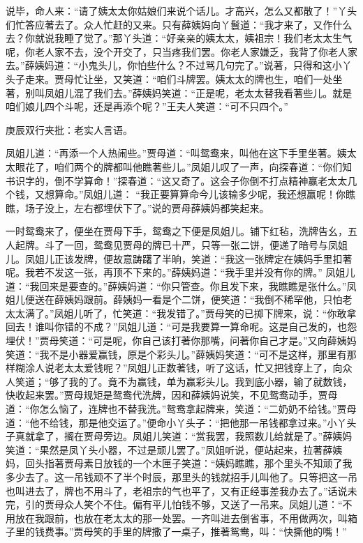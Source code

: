 \begin{parag}
    说毕，命人来：“请了姨太太你姑娘们来说个话儿。才高兴，怎么又都散了！”丫头们忙答应著去了。众人忙赶的又来。只有薛姨妈向丫鬟道：“我才来了，又作什么去？你就说我睡了觉了。”那丫头道：“好亲亲的姨太太，姨祖宗！我们老太太生气呢，你老人家不去，没个开交了，只当疼我们罢。你老人家嫌乏，我背了你老人家去。”薛姨妈道：“小鬼头儿，你怕些什么？不过骂几句完了。”说著，只得和这小丫头子走来。贾母忙让坐，又笑道：“咱们斗牌罢。姨太太的牌也生，咱们一处坐著，别叫凤姐儿混了我们去。”薛姨妈笑道：“正是呢，老太太替我看著些儿。就是咱们娘儿四个斗呢，还是再添个呢？”王夫人笑道：“可不只四个。”\begin{note}庚辰双行夹批：老实人言语。\end{note}凤姐儿道：“再添一个人热闹些。”贾母道：“叫鸳鸯来，叫他在这下手里坐著。姨太太眼花了，咱们两个的牌都叫他瞧著些儿。”凤姐儿叹了一声，向探春道：“你们知书识字的，倒不学算命！”探春道：“这又奇了。这会子你倒不打点精神赢老太太几个钱，又想算命。”凤姐儿道： “我正要算算命今儿该输多少呢，我还想赢呢！你瞧瞧，场子没上，左右都埋伏下了。”说的贾母薛姨妈都笑起来。
\end{parag}


\begin{parag}
    一时鸳鸯来了，便坐在贾母下手，鸳鸯之下便是凤姐儿。铺下红毡，洗牌告幺，五人起牌。斗了一回，鸳鸯见贾母的牌已十严，只等一张二饼，便递了暗号与凤姐儿。凤姐儿正该发牌，便故意踌躇了半晌，笑道：“我这一张牌定在姨妈手里扣著呢。我若不发这一张，再顶不下来的。”薛姨妈道：“我手里并没有你的牌。” 凤姐儿道：“我回来是要查的。”薛姨妈道：“你只管查。你且发下来，我瞧瞧是张什么。”凤姐儿便送在薛姨妈跟前。薛姨妈一看是个二饼，便笑道：“我倒不稀罕他，只怕老太太满了。”凤姐儿听了，忙笑道：“我发错了。”贾母笑的已掷下牌来，说：“你敢拿回去！谁叫你错的不成？”凤姐儿道：“可是我要算一算命呢。这是自己发的，也怨埋伏！”贾母笑道：“可是呢，你自己该打著你那嘴，问著你自己才是。”又向薛姨妈笑道：“我不是小器爱赢钱，原是个彩头儿。”薛姨妈笑道：“可不是这样，那里有那样糊涂人说老太太爱钱呢？”凤姐儿正数著钱，听了这话，忙又把钱穿上了，向众人笑道；“够了我的了。竟不为赢钱，单为赢彩头儿。我到底小器，输了就数钱，快收起来罢。”贾母规矩是鸳鸯代洗牌，因和薛姨妈说笑，不见鸳鸯动手，贾母道：“你怎么恼了，连牌也不替我洗。”鸳鸯拿起牌来，笑道：“二奶奶不给钱。”贾母道：“他不给钱，那是他交运了。”便命小丫头子：“把他那一吊钱都拿过来。”小丫头子真就拿了，搁在贾母旁边。凤姐儿笑道：“赏我罢，我照数儿给就是了。”薛姨妈笑道：“果然是凤丫头小器，不过是顽儿罢了。”凤姐听说，便站起来，拉著薛姨妈，回头指著贾母素日放钱的一个木匣子笑道：“姨妈瞧瞧，那个里头不知顽了我多少去了。这一吊钱顽不了半个时辰，那里头的钱就招手儿叫他了。只等把这一吊也叫进去了，牌也不用斗了，老祖宗的气也平了，又有正经事差我办去了。”话说未完，引的贾母众人笑个不住。偏有平儿怕钱不够，又送了一吊来。凤姐儿道：“不用放在我跟前，也放在老太太的那一处罢。一齐叫进去倒省事，不用做两次，叫箱子里的钱费事。”贾母笑的手里的牌撒了一桌子，推著鸳鸯，叫：“快撕他的嘴！”
\end{parag}


